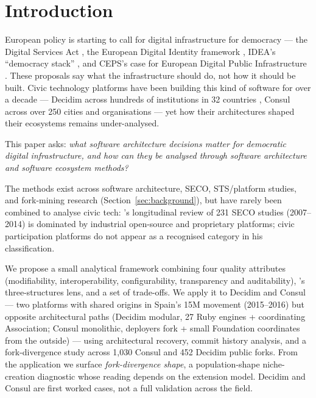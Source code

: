 \documentclass[11pt,a4paper]{article}
\begin{document}
\newpage
\tableofcontents
\newpage

\section{Introduction}

European policy is starting to call for digital infrastructure for democracy --- the Digital Services Act \citep{eu2022dsa}, the European Digital Identity framework \citep{eu2024eid}, IDEA's ``democracy stack'' \citep{idea2026democracy}, and CEPS's case for European Digital Public Infrastructure \citep{ceps2025building}. These proposals say what the infrastructure should do, not how it should be built. Civic technology platforms have been building this kind of software for over a decade --- Decidim across hundreds of institutions in 32 countries \citep{barandiaran2024decidim}, Consul across over 250 cities and organisations \citep{ntari2025consul} --- yet how their architectures shaped their ecosystems remains under-analysed.

This paper asks: \emph{what software architecture decisions matter for democratic digital infrastructure, and how can they be analysed through software architecture and software ecosystem methods?}

The methods exist across software architecture, SECO, STS/platform studies, and fork-mining research (Section~\ref{sec:background}), but have rarely been combined to analyse civic tech: \citet{manikas2016revisiting}'s longitudinal review of 231 SECO studies (2007--2014) is dominated by industrial open-source and proprietary platforms; civic participation platforms do not appear as a recognised category in his classification.

We propose a small analytical framework combining four quality attributes (modifiability, interoperability, configurability, transparency and auditability), \citet{christensen2014analysis}'s three-structures lens, and a set of trade-offs. We apply it to Decidim and Consul --- two platforms with shared origins in Spain's 15M movement (2015--2016) but opposite architectural paths (Decidim modular, 27 Ruby engines + coordinating Association; Consul monolithic, deployers fork + small Foundation coordinates from the outside) --- using architectural recovery, commit history analysis, and a fork-divergence study across 1{,}030 Consul and 452 Decidim public forks. From the application we surface \emph{fork-divergence shape}, a population-shape niche-creation diagnostic whose reading depends on the extension model. Decidim and Consul are first worked cases, not a full validation across the field.
\end{document}

